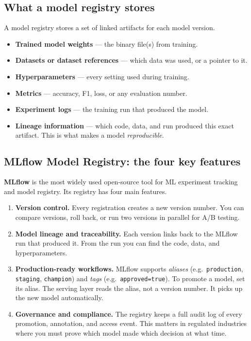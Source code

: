 \documentclass[a4paper,11pt]{article}
\newcommand{\vocab}[1]{\textbf{\color{navy}#1}}
\begin{document}
\subsection{What a model registry stores}

A model registry stores a set of linked artifacts for each model version.

\begin{itemize}
  \item \textbf{Trained model weights} --- the binary file(s) from training.
  \item \textbf{Datasets or dataset references} --- which data was used, or
        a pointer to it.
  \item \textbf{Hyperparameters} --- every setting used during training.
  \item \textbf{Metrics} --- accuracy, F1, loss, or any evaluation number.
  \item \textbf{Experiment logs} --- the training run that produced the model.
  \item \textbf{Lineage information} --- which code, data, and run produced
        this exact artifact. This is what makes a model \emph{reproducible}.
\end{itemize}

\subsection{MLflow Model Registry: the four key features}

\vocab{MLflow} is the most widely used open-source tool for ML experiment
tracking and model registry. Its registry has four main features.

\begin{enumerate}
  \item \textbf{Version control.} Every registration creates a new version
        number. You can compare versions, roll back, or run two versions
        in parallel for A/B testing.
  \item \textbf{Model lineage and traceability.} Each version links back to
        the MLflow run that produced it. From the run you can find the code,
        data, and hyperparameters.
  \item \textbf{Production-ready workflows.} MLflow supports \emph{aliases}
        (e.g.\ \texttt{production}, \texttt{staging}, \texttt{champion}) and
        \emph{tags} (e.g.\ \texttt{approved=true}).
        To promote a model, set its alias.
        The serving layer reads the alias, not a version number.
        It picks up the new model automatically.
  \item \textbf{Governance and compliance.} The registry keeps a full audit
        log of every promotion, annotation, and access event. This matters in
        regulated industries where you must prove which model made which
        decision at what time.
\end{enumerate}
\end{document}
